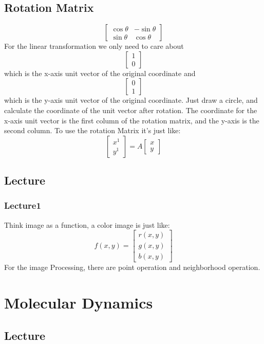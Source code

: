 \documentclass[a4paper]{article}
\begin{document}
\subsection{Rotation Matrix}
$$
\begin{bmatrix}
	{\cos\theta} & {-\sin\theta} \\
	{\sin\theta} & {\cos\theta}
\end{bmatrix}	
$$
For the linear transformation we only need to care about 
$$
\begin{bmatrix}
	1 \\
	0
\end{bmatrix}
$$
which is the x-axis unit vector of the original coordinate and
$$ 
\begin{bmatrix}
	0 \\
	1
\end{bmatrix}
$$
which is the y-axis unit vector of the original coordinate.
Just draw a circle, and calculate the coordinate of the unit vector after rotation. The coordinate for the x-axis unit vector is the first column of the rotation matrix, and the y-axis is the second column.
\bigskip
To use the rotation Matrix it's just like:
$$
\begin{bmatrix}
	x^{1}\\
	y^{1}
\end{bmatrix}
=A
\begin{bmatrix}
	x\\
	y
\end{bmatrix}
$$
\subsection{Lecture}
\subsubsection{Lecture1}
Think image as a function, a color image is just like:
$$
f(x, y)=
\begin{bmatrix}
	r(x,y)\\
	g(x,y)\\
	b(x,y)
\end{bmatrix}
$$
\bigskip
For the image Processing, there are point operation and neighborhood operation.


\section{Molecular Dynamics}
\subsection{Lecture}
\end{document}
